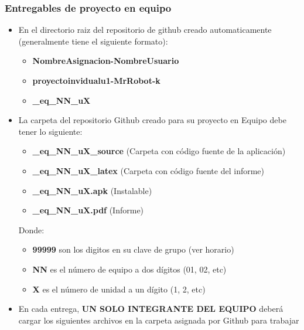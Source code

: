 \begin{frame}
\frametitle{Entregables de proyecto en equipo}
    \begin{itemize}
    \item En el directorio raiz del repositorio de github creado automaticamente (generalmente tiene el siguiente formato):
    \begin{itemize}
		\item \textbf{NombreAsignacion-NombreUsuario}
        \item \textbf{proyectoinvidualu1-MrRobot-k}
    \end{itemize}
    \begin{itemize}
        \item \textbf{\clavegrupo\_eq\_NN\_uX}
    \end{itemize}
    \item La carpeta del repositorio  Github creado para su proyecto en Equipo debe tener lo siguiente:
\begin{itemize}
\item \textbf{\clavegrupo\_eq\_NN\_uX\_source} (Carpeta con c\'odigo fuente de la aplicaci\'on)
\item \textbf{\clavegrupo\_eq\_NN\_uX\_latex} (Carpeta con c\'odigo fuente del informe)
\item \textbf{\clavegrupo\_eq\_NN\_uX.apk} (Instalable)
\item \textbf{\clavegrupo\_eq\_NN\_uX.pdf} (Informe)
\end{itemize}
Donde:
\begin{itemize}
\item \textbf{99999} son los digitos en su clave de grupo (ver horario)
\item \textbf{NN} es el n\'umero de equipo a dos d\'igitos (01, 02, etc)
\item \textbf{X} es el n\'umero de unidad a un d\'igito (1, 2, etc)
\end{itemize}
\item En cada entrega, \textbf{UN SOLO INTEGRANTE DEL EQUIPO} deberá cargar los siguientes archivos en la carpeta asignada por Github para trabajar
\end{itemize}


\end{frame}




